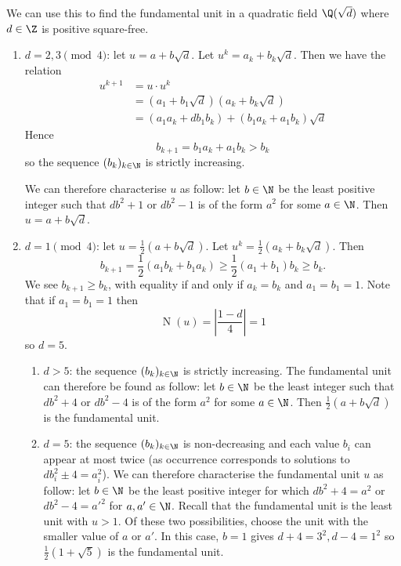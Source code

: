 \documentclass[a4paper]{article}
\DeclareMathOperator{\n}{N}
\begin{document}
We can use this to find the fundamental unit in a quadratic field \(\Q(\sqrt d)\) where \(d \in \Z\) is positive square-free.
\begin{enumerate}
\item \(d = 2, 3 \pmod 4\): let \(u = a + b \sqrt d\). Let \(u^k = a_k + b_k \sqrt d\). Then we have the relation
  \begin{align*}
    u^{k + 1}
    &= u \cdot u^k \\
    &= (a_1 + b_1 \sqrt d)(a_k + b_k \sqrt d) \\
    &= (a_1a_k + d b_1b_k) + (b_1a_k + a_1b_k) \sqrt d
  \end{align*}
  Hence
  \[
    b_{k + 1} = b_1a_k + a_1b_k > b_k
  \]
  so the sequence \((b_k)_{k \in \N}\) is strictly increasing.

  We can therefore characterise \(u\) as follow: let \(b \in \N\) be the least positive integer such that \(db^2 + 1\) or \(db^2 - 1\) is of the form \(a^2\) for some \(a \in \N\). Then \(u = a + b \sqrt d\).

\item \(d = 1 \pmod 4\): let \(u = \frac{1}{2}(a + b \sqrt d)\). Let \(u^k = \frac{1}{2}(a_k + b_k\sqrt d)\). Then
  \[
    b_{k + 1} = \frac{1}{2}(a_1b_k + b_1 a_k) \geq \frac{1}{2} (a_1 + b_1)b_k \geq b_k.
  \]
  We see \(b_{k + 1} \geq b_k\), with equality if and only if \(a_k = b_k\) and \(a_1 = b_1 = 1\). Note that if \(a_1 = b_1 = 1\) then
  \[
    \n(u) = \left| \frac{1 - d}{4} \right| = 1
  \]
  so \(d = 5\).
  \begin{enumerate}
  \item \(d > 5\): the sequence \((b_k)_{k \in \N}\) is strictly increasing. The fundamental unit can therefore be found as follow: let \(b \in \N\) be the least integer such that \(db^2 + 4\) or \(db^2 - 4\) is of the form \(a^2\) for some \(a \in \N\). Then \(\frac{1}{2}(a + b\sqrt d)\) is the fundamental unit.

  \item \(d = 5\): the sequence \((b_k)_{k \in \N}\) is non-decreasing and each value \(b_i\) can appear at most twice (as occurrence corresponds to solutions to \(db_i^2 \pm 4 = a_i^2\)). We can therefore characterise the fundamental unit \(u\) as follow: let \(b \in \N\) be the least positive integer for which \(db^2 + 4 = a^2\) or \(db^2 - 4 = a'^2\) for \(a, a' \in \N\). Recall that the fundamental unit is the least unit with \(u > 1\). Of these two possibilities, choose the unit with the smaller value of \(a\) or \(a'\). In this case, \(b = 1\) gives \(d + 4 = 3^2, d - 4 = 1^2\) so \(\frac{1}{2} (1 + \sqrt 5)\) is the fundamental unit.
  \end{enumerate}
\end{enumerate}
\end{document}

